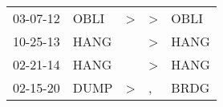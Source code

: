 \begin{supertabular}{p{0.07\textwidth}p{0.06\textwidth}p{0.02\textwidth}p{0.02\textwidth}p{0.06\textwidth}}
 03-07-12\textsuperscript{} &  OBLI\textsuperscript{} &  \textgreater &  \textgreater &  OBLI\textsuperscript{} \\
 10-25-13\textsuperscript{} &  HANG\textsuperscript{} &               &  \textgreater &  HANG\textsuperscript{} \\
 02-21-14\textsuperscript{} &  HANG\textsuperscript{} &               &  \textgreater &  HANG\textsuperscript{} \\
 02-15-20\textsuperscript{} &  DUMP\textsuperscript{} &  \textgreater &             , &  BRDG\textsuperscript{} \\
\end{supertabular}
